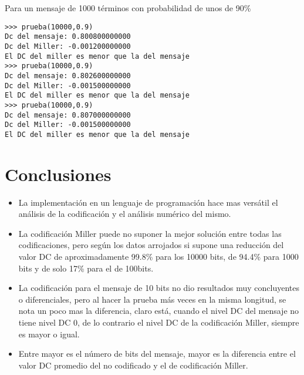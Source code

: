\documentclass{article}
\begin{document}
Para un mensaje de 1000 términos con probabilidad de unos de 90\%
\begin{verbatim}
>>> prueba(10000,0.9)
Dc del mensaje: 0.800800000000
Dc del Miller: -0.001200000000
El DC del miller es menor que la del mensaje
>>> prueba(10000,0.9)
Dc del mensaje: 0.802600000000
Dc del Miller: -0.001500000000
El DC del miller es menor que la del mensaje
>>> prueba(10000,0.9)
Dc del mensaje: 0.807000000000
Dc del Miller: -0.001500000000
El DC del miller es menor que la del mensaje
\end{verbatim}

\section {Conclusiones}

\begin{itemize}
\item La implementación en un lenguaje de programación hace mas versátil el análisis de la codificación y el análisis numérico del mismo.
\item La codificación Miller puede no suponer la mejor solución entre todas las codificaciones, pero según los datos arrojados si supone una reducción del valor DC de aproximadamente 99.8\% para los 10000 bits, de 94.4\% para 1000 bits y de solo 17\% para el de 100bits. 
\item La codificación para el mensaje de 10 bits no dio resultados muy concluyentes o diferenciales, pero al hacer la prueba más veces en la misma longitud, se nota un poco mas la diferencia, claro está, cuando el nivel DC del mensaje no tiene nivel DC 0, de lo contrario el nivel DC de la codificación Miller, siempre es mayor o igual.
\item Entre mayor es el número de bits del mensaje, mayor es la diferencia entre el valor DC promedio del no codificado y el de codificación Miller.
\end{itemize}
\end{document}
